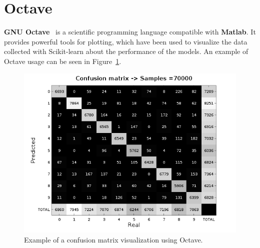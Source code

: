 \section{Octave} \label{sec:octave}
\textbf{GNU Octave}~\cite{octave} is a scientific programming language compatible with \textbf{Matlab}. It provides powerful tools for plotting, which have been used to visualize the data collected with Scikit-learn about the performance of the models. An example of Octave usage can be seen in Figure~\ref{fig:conf_mat}.
\begin{figure}
	\centering
	\includegraphics[width=0.8\linewidth, keepaspectratio]{figures/conf_mat.png}
	\caption{Example of a confusion matrix visualization using Octave.}
	\label{fig:conf_mat}
\end{figure}